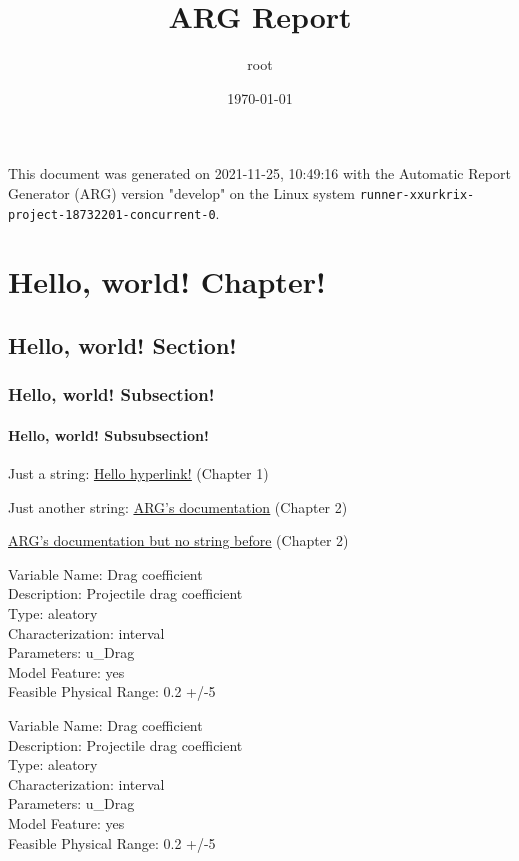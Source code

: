 \documentclass[letter,titlepage,oneside,11pt]{report}%
\title{\textbf{ARG Report}}%
\author{root}%
\date{\today}%
\begin{document}
%
\normalsize%
\maketitle%
\cleardoublepage%
This document was generated on 2021-11-25, 10:49:16 with the Automatic Report Generator (ARG) version "develop" on the Linux system \texttt{runner-xxurkrix-project-18732201-concurrent-0}.%
\cleardoublepage%
\tableofcontents%
\listoffigures%
\listoftables%
\cleardoublepage%
\chapter{Hello, world! Chapter!}%
\par%
\section{Hello, world! Section!}%
\par%
\subsection{Hello, world! Subsection!}%
\par%
\subsubsection{Hello, world! Subsubsection!}%
\par%
\par%
Just a string: %
\href{expected/build_tests-hello_world-Report-LaTeX.pdf}{\underline{Hello hyperlink!}}%
 (Chapter 1)%
\\%
\par%
Just another string: %
\href{https://automaticreportgenerator.gitlab.io/arg/}{\underline{ARG's documentation}}%
 (Chapter 2)%
\\%
\par%
\href{https://automaticreportgenerator.gitlab.io/arg/}{\underline{ARG's documentation but no string before}}%
 (Chapter 2)%
\\%
\par%
Variable Name: Drag coefficient\\Description: Projectile drag coefficient\\Type: aleatory\\Characterization: interval\\Parameters: u_Drag\\Model Feature: yes\\Feasible Physical Range: 0.2 +/-5%
\par%
Variable Name: Drag coefficient\\Description: Projectile drag coefficient\\Type: aleatory\\Characterization: interval\\Parameters: u_Drag\\Model Feature: yes\\Feasible Physical Range: 0.2 +/-5%
\end{document}
